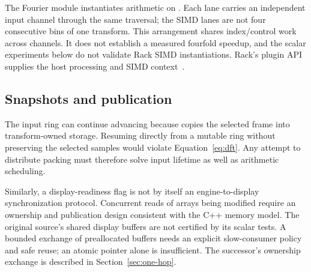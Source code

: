 The Fourier module instantiates arithmetic on . Each lane
carries an independent input channel through the same traversal; the SIMD
lanes are not four consecutive bins of one transform. This arrangement
shares index/control work across channels. It does not establish a measured
fourfold speedup, and the scalar experiments below do not validate Rack SIMD
instantiations. Rack's plugin API supplies the host processing and SIMD
context~\cite{rack}.

\subsection{Snapshots and publication}
The input ring can continue advancing because  copies the
selected frame into transform-owned storage. Resuming directly from a mutable
ring without preserving the selected samples would violate
Equation~\eqref{eq:dft}. Any attempt to distribute packing must therefore solve
input lifetime as well as arithmetic scheduling.

Similarly, a display-readiness flag is not by itself an engine-to-display
synchronization protocol. Concurrent reads of arrays being modified require an
ownership and publication design consistent with the C++ memory model. The
original source's shared display buffers are not certified by its scalar tests.
A bounded exchange of preallocated buffers needs an explicit slow-consumer
policy and safe reuse; an atomic pointer alone is insufficient. The successor's
ownership exchange is described in Section~\ref{sec:one-hop}.

